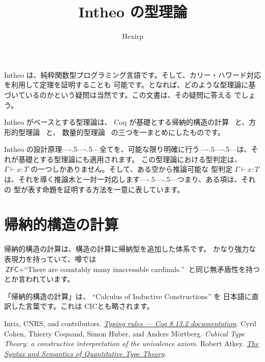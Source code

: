 \documentclass[book]{jlreq}
\title{Intheo の型理論}
\author{Hexirp}
\def\——{—\kern-.5\zw—\kern-.5\zw—}
\newcommand{\bidash}{\——}
\newcommand{\CIC}{\textsf{CIC}}
\begin{document}
\frontmatter

\maketitle

Intheo は、純粋関数型プログラミング言語です。そして、カリー・ハワード対応を利用して定理を証明することも
可能です。となれば、どのような型理論に基づいているのかという疑問は当然です。この文書は、その疑問に答える
でしょう。

Intheo がベースとする型理論は、 Coq が基礎とする帰納的構造の計算~\cite{cic} と、方形的型理論~\cite{cutt} と、
数量的型理論~\cite{qtt} の三つを一まとめにしたものです。

Intheo の設計原理\bidash{}全てを、可能な限り明確に行う\bidash{}は、それが基礎とする型理論にも適用されます。
この型理論における型判定は、 \( Γ \vdash x : T \) の一つしかありません。そして、ある空から推論可能な
型判定 \( Γ \vdash x : T \) は、それを導く推論木と一対一対応します\bidash{}つまり、ある項は、それの
型が表す命題を証明する方法を一意に表しています。

\tableofcontents

\mainmatter

\part{帰納的構造の計算}

帰納的構造の計算は、構造の計算に帰納型を追加した体系です。
かなり強力な表現力を持っていて、噂では \( \textsf{ZFC} + \textrm{``There are countably many inaccessible
cardinals.''} \) と同じ無矛盾性を持つとか言われています。

「帰納的構造の計算」は、 ``Calculus of Inductive Constructions'' を
日本語に直訳した言葉です。これは \index{CIC@\CIC}\CIC とも略されます。

\backmatter

\begin{thebibliography}{99}
    Inria, CNRS, and contributors.
    \href{https://coq.github.io/doc/v8.13/refman/language/cic.html}{\textit{Typing rules --- Coq 8.13.2 documentation}}.
    Cyril Cohen, Thierry Coquand, Simon Huber, and Anders Mörtberg.
    \textit{Cubical Type Theory: a constructive interpretation of the univalence axiom}.
    Robert Atkey.
    \href{https://bentnib.org/quantitative-type-theory.html}{\textit{The Syntax and Semantics of Quantitative Type Theory}}.
\end{thebibliography}

\printindex
\end{document}
